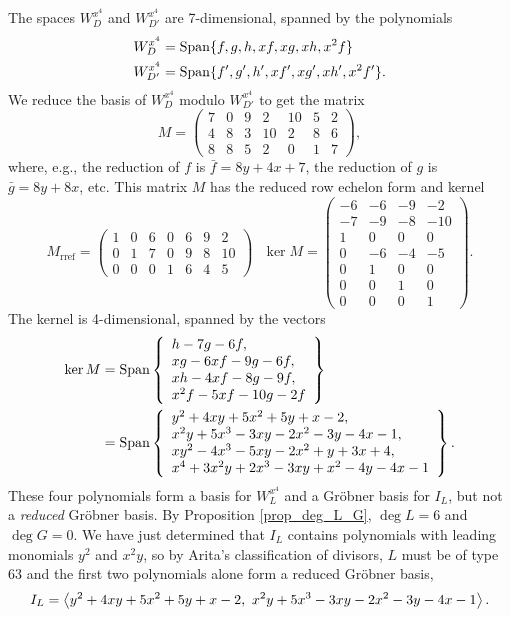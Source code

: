 The spaces $W_D^{x^4}$ and $W_{D'}^{x^4}$ are 7-dimensional, spanned by the polynomials
\begin{align*}
  W_D^{x^4} &= \operatorname{Span}\{ f, g, h, xf, xg, xh, x^2f \} \\
  W_{D'}^{x^4} &= \operatorname{Span}\{ f', g', h', xf', xg', xh', x^2f' \}.
\end{align*}
We reduce the basis of $W_D^{x^4}$ modulo $W_{D'}^{x^4}$ to get the matrix
\[ M = \begin{pmatrix}
  7 & 0 & 9 & 2 & 10 & 5 & 2 \\
  4 & 8 & 3 & 10 & 2 & 8 & 6 \\
  8 & 8 & 5 & 2 & 0 & 1 & 7
\end{pmatrix}, \]
where, e.g., the reduction of $f$ is $\bar f = 8y + 4x + 7$,
the reduction of $g$ is $\bar g = 8y + 8x$, etc.
This matrix $M$ has the reduced row echelon form
and kernel
\[ M_{\text{rref}} = \begin{pmatrix}
  1 & 0 & 6 & 0 & 6 & 9 & 2 \\
  0 & 1 & 7 & 0 & 9 & 8 & 10 \\
  0 & 0 & 0 & 1 & 6 & 4 & 5
\end{pmatrix} ~~~ \ker M =
\begin{pmatrix}
  -6 & -6 & -9 & -2 \\
  -7 & -9 & -8 & -10 \\
   1 &  0 &  0 &  0 \\
   0 & -6 & -4 & -5 \\
   0 &  1 &  0 &  0 \\
   0 &  0 &  1 &  0 \\
   0 &  0 &  0 &  1
\end{pmatrix}. \]
The kernel is 4-dimensional, spanned by the vectors
\begin{align*}
  \ker M
    &= \operatorname{Span} \left\{ \begin{array}{l}
               h -  7g - 6f, \\
        xg - 6xf -  9g - 6f, \\
        xh - 4xf -  8g - 9f, \\
      x^2f - 5xf - 10g - 2f \end{array} \right\} \\
    &= \operatorname{Span} \left\{ \begin{array}{l}
      y^2 + 4xy + 5x^2 + 5y + x - 2, \\
      x^2y + 5x^3 - 3xy - 2x^2 - 3y - 4x - 1, \\
      xy^2 - 4x^3 - 5xy - 2x^2 + y + 3x + 4, \\
      x^4 + 3x^2y + 2x^3 - 3xy + x^2 - 4y - 4x - 1
    \end{array} \right\}.
\end{align*}
These four polynomials form a basis for $W_L^{x^4}$ and a Gr\"obner basis for $I_L$,
but not a \emph{reduced} Gr\"obner basis.
By Proposition \ref{prop_deg_L_G}, $\deg L = 6$ and $\deg G = 0$.
We have just determined that $I_L$ contains polynomials with leading monomials $y^2$ and $x^2y$,
so by Arita's classification of divisors, $L$ must be of type 63 and the first two polynomials
alone form a reduced Gr\"obner basis,
  \[ I_L = \left\langle  y^2 + 4xy + 5x^2 + 5y + x - 2, ~x^2y + 5x^3 - 3xy - 2x^2 - 3y - 4x - 1 \right\rangle.\]

